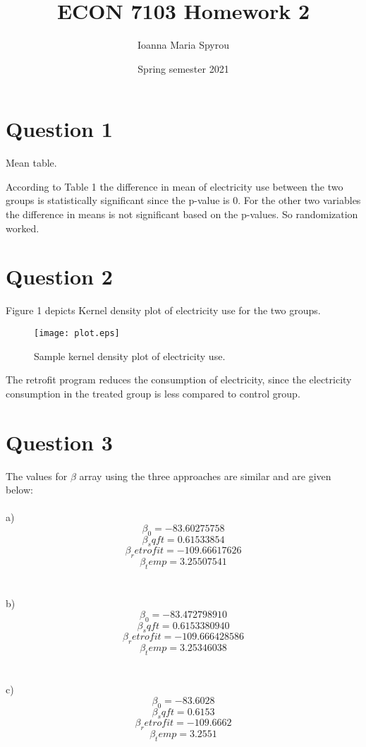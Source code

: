\documentclass{article}
\title{ECON 7103 Homework 2}
\author{Ioanna Maria Spyrou}
\date{Spring semester 2021}
\begin{document}
  
\maketitle


\section{Question 1}

\begin{table}[h]
    \centering
    
    \caption{Mean table.}
    \label{tab:my_label}
\end{table}

According to Table 1 the difference in mean of electricity use between the two groups is statistically significant since the p-value is 0. For the other two variables the difference in means is not significant based on the p-values. So randomization worked.

\section{Question 2}
Figure 1 depicts Kernel density plot of electricity use for the two groups.

\begin{figure}[ht]
    \centering
    \texttt{[image: plot.eps]}
    \caption{Sample kernel density plot of electricity use.}
    \label{fig:plot}
\end{figure}

The retrofit program reduces the consumption of electricity, since the electricity consumption in the treated group is less compared to control group.

\section{Question 3}
The values for $\beta$ array using the three approaches are similar and are given below:\\
\\a)
$$\beta_0 = -83.60275758$$
$$\beta_sqft = 0.61533854$$
$$\beta_retrofit =-109.66617626$$
$$\beta_temp = 3.25507541$$\\
\\b)
$$\beta_0 = -83.472798910$$
$$\beta_sqft = 0.6153380940$$
$$\beta_retrofit =-109.666428586$$
$$\beta_temp = 3.25346038$$\\
\\c)
$$\beta_0 = -83.6028$$
$$\beta_sqft = 0.6153$$
$$\beta_retrofit =-109.6662$$
$$\beta_temp = 3.2551$$
\end{document}
